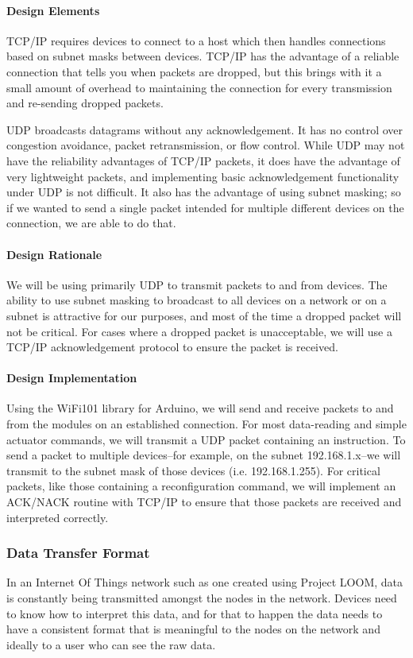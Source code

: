 \documentclass[onecolumn, draftclsnofoot,10pt, compsoc]{IEEEtran}
\begin{document}
\paragraph{Design Elements}
TCP/IP \cite{TCP} requires devices to connect to a host which then handles connections based on subnet masks between devices. TCP/IP has the advantage of a reliable connection that tells you when packets are dropped, but this brings with it a small amount of overhead to maintaining the connection for every transmission and re-sending dropped packets.

UDP \cite{UDP} broadcasts datagrams without any acknowledgement. It has no control over congestion avoidance, packet retransmission, or flow control. While UDP may not have the reliability advantages of TCP/IP packets, it does have the advantage of very lightweight packets, and implementing basic acknowledgement functionality under UDP is not difficult. It also has the advantage of using subnet masking; so if we wanted to send a single packet intended for multiple different devices on the connection, we are able to do that.

\paragraph{Design Rationale}
We will be using primarily UDP to transmit packets to and from devices. The ability to use subnet masking to broadcast to all devices on a network or on a subnet is attractive for our purposes, and most of the time a dropped packet will not be critical. For cases where a dropped packet is unacceptable, we will use a TCP/IP acknowledgement protocol to ensure the packet is received.

\paragraph{Design Implementation}
Using the WiFi101 library for Arduino, we will send and receive packets to and from the modules on an established connection. For most data-reading and simple actuator commands, we will transmit a UDP packet containing an instruction. To send a packet to multiple devices--for example, on the subnet 192.168.1.x--we will transmit to the subnet mask of those devices (i.e. 192.168.1.255). For critical packets, like those containing a reconfiguration command, we will implement an ACK/NACK routine with TCP/IP to ensure that those packets are received and interpreted correctly.


\subsubsection{Data Transfer Format}
In an Internet Of Things network such as one created using Project LOOM, data is constantly being transmitted amongst the nodes in the network. Devices need to know how to interpret this data, and for that to happen the data needs to have a consistent format that is meaningful to the nodes on the network and ideally to a user who can see the raw data.
\end{document}
